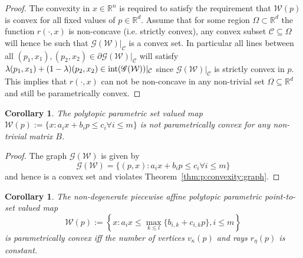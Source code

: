 \documentclass[journal]{IEEEtran}
\newcounter{thmcount}
\newtheorem{cor}[thmcount]{Corollary}
\theoremstyle{remark}
\theoremstyle{definition}
\begin{document}
%
\begin{proof}
The convexity in $x\in\mathbb R^n$ is required to satisfy the requirement that $\mathcal W(p)$ is convex
for all fixed values of $p\in\mathbb R^d$. 
%
Assume that for some region $\Omega\subset\mathbb R^d$ the function $r(\cdot,x)$ is non-concave (i.e. 
strictly convex), any convex subset $\mathcal C\subseteq\Omega$ will hence be such that $\mathscr 
G(\mathcal W)\vert_{\mathcal C}$ is a convex set.
%
In particular all lines between all $(p_1,x_1),(p_2,x_2)\in \partial\mathscr G(\mathcal W)\vert_{\mathcal C}$ will satisfy
$\lambda (p_1,x_1) + (1-\lambda) (p_2,x_2) \in\textup{int} (\mathscr G(\mathcal W))\vert_{\mathcal C}$ since
$\mathscr G(\mathcal W)\vert_{\mathcal C}$ is strictly convex in $p$.
%
This implies that $r(\cdot,x)$ can not be non-concave in any non-trivial set $\Omega\subseteq\mathbb R^d$ and still
be parametrically convex.
\end{proof}
%
\begin{cor}\label{thm:polytopic:set:not:p:convex}
The polytopic parametric set valued map $\mathcal W(p):=\{x: a_i x + b_i p\leq c_i \forall i\leq m\}$ is not parametrically convex for 
any non-trivial matrix $B$.
\end{cor}
%
\begin{proof}
The graph $\mathscr G(\mathcal W)$ is given by
%
\begin{equation*}
	\mathscr G(\mathcal W) = \{(p,x):a_i x + b_i p\leq c_i \forall i\leq m\}
\end{equation*}
%
and hence is a convex set and violates Theorem~\ref{thm:p:convexity:graph}.
\end{proof}
%
\begin{cor}\label{thm:p:convexity:PWA:set:constant:num:verts}
The non-degenerate piecewise affine polytopic parametric point-to-set valued map 
%
\begin{equation}\label{eq:definition:PWA:polytopic:set:general}
  \mathcal W(p) := \left\{x: a_i x \leq \max_{k\leq l}\{b_{i,k} + c_{i,k}p\},i\leq m\right\}
\end{equation}
%
is parametrically convex iff the number of vertices $v_\kappa(p)$ and rays $r_\eta(p)$ is constant.
\end{cor}
%
\end{document}
